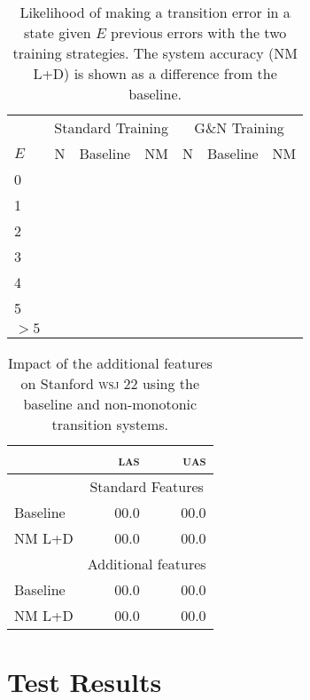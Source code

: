 \documentclass[11pt,letterpaper]{article}
\newcommand{\las}{\textsc{las}\xspace}
\newcommand{\uas}{\textsc{uas}\xspace}
\newcommand{\wsj}{\textsc{wsj}\xspace}
\begin{document}
\begin{table}
    \small
    \centering
    \begin{tabular}{l|rrr|rrr}
        & \multicolumn{3}{c|}{Standard Training} & \multicolumn{3}{c}{G\&N Training}\\
        $E$   & N & Baseline & NM    & N &Baseline & NM    \\
        \hline \hline
        0     &   &          &        &   &       &        \\
        1     &   &          &        &   &       &        \\
        2     &   &          &        &   &       &        \\
        3     &   &          &        &   &       &        \\
        4     &   &          &        &   &       &        \\
        5     &   &          &        &   &       &        \\
        $>5$  &   &          &        &   &       &        \\
        \hline
    \end{tabular}
\caption{\small Likelihood of making a transition error in a state given $E$ previous
         errors with the two training strategies. The system accuracy (NM L+D) is
     shown as a difference from the baseline.\label{tab:errprop}}
\end{table}


\begin{table}
\centering
\begin{tabular}{lrr}
    \hline 
            & \las  & \uas  \\
    \hline \hline 
                & \multicolumn{2}{c}{Standard Features} \\
                \hline
    Baseline    & 00.0 & 00.0 \\
    NM L+D      & 00.0 & 00.0 \\
\hline
                & \multicolumn{2}{c}{Additional features} \\
                \hline
    Baseline    & 00.0 & 00.0 \\
    NM L+D      & 00.0 & 00.0 \\
\end{tabular}
\caption{
    \small
    Impact of the additional features on Stanford \wsj22 using the baseline and
    non-monotonic transition systems.
\label{tab:feats}}
\end{table}


\section{Test Results}
\end{document}
